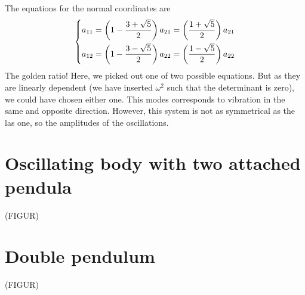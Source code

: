 \documentclass{article}
\begin{document}
    The equations for the normal coordinates are
    \begin{equation*}
        \begin{dcases*}
            a_{11} = \left(1 - \frac{3 + \sqrt{5}}{2}\right)a_{21} = \left(\frac{1 + \sqrt{5}}{2}\right)a_{21}\\
            a_{12} = \left(1 - \frac{3 - \sqrt{5}}{2}\right)a_{22} = \left(\frac{1 - \sqrt{5}}{2}\right)a_{22}\\
        \end{dcases*}
    \end{equation*}
    The golden ratio! Here, we picked out one of two possible equations. But as they are linearly dependent (we have inserted $\omega^2$ such that the determinant is zero), we could have chosen either one. This modes corresponds to vibration in the same and opposite direction. However, this system is not as symmetrical as the las one, so the amplitudes of the oscillations. 

    \section{Oscillating body with two attached pendula}
    (FIGUR) \\

    \section{Double pendulum}
    (FIGUR) \\
\end{document}
